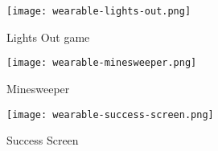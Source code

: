 \begin{figure}
    \centering
    \texttt{[image: wearable-lights-out.png]}
    \caption{Lights Out game}
    \label{fig:lights_out_game}
    \texttt{[image: wearable-minesweeper.png]}
    \caption{Minesweeper}
    \label{fig:minesweeper}
\end{figure}

\begin{figure}
    \centering
    \texttt{[image: wearable-success-screen.png]}
    \caption{Success Screen}
    \label{fig:success_screen}
\end{figure}

